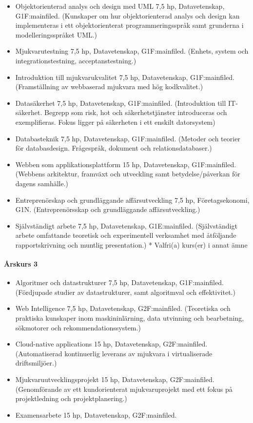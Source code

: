 \documentclass[swedish]{LnuCmThesis}
\begin{document}
\begin{itemize}
    \item Objektorienterad analys och design med UML 7,5 hp, Datavetenskap, G1F\fn:mainfiled{}. (Kunskaper om hur objektorienterad analys och design kan implementeras i ett objektorienterat programmeringsspråk samt grunderna i modelleringsspråket UML.)
    \item Mjukvarutestning 7,5 hp, Datavetenskap, G1F\fn:mainfiled{}. (Enhets­, system­ och integrationstestning, acceptanstestning.)
    \item Introduktion till mjukvarukvalitet 7,5 hp, Datavetenskap, G1F\fn:mainfiled{}. (Framställning av webbaserad mjukvara med hög kodkvalitet.)
    \item Datasäkerhet 7,5 hp, Datavetenskap, G1F\fn:mainfiled{}. (Introduktion till IT­säkerhet. Begrepp som risk, hot och säkerhetstjänster introduceras och exemplifieras. Fokus ligger på säkerheten i ett enskilt datorsystem)
    \item Databasteknik 7,5 hp, Datavetenskap, G1F\fn:mainfiled{}. (Metoder och teorier för databasdesign. Frågespråk, dokument­ och relationsdatabaser.)
    \item Webben som applikationsplattform 15 hp, Datavetenskap, G1F\fn:mainfiled{}. (Webbens arkitektur, framväxt och utveckling samt betydelse/påverkan för dagens samhälle.)
    \item Entreprenörskap och grundläggande affärsutveckling 7,5 hp, Företagsekonomi, G1N. (Entreprenörsskap och grundläggande affärsutveckling.)
    \item Självständigt arbete 7,5 hp, Datavetenskap, G1E\fn:mainfiled{}. (Självständigt arbete omfattande teoretisk och experimentell verksamhet med åtföljande rapportskrivning och muntlig presentation.)
    * Valfri(a) kurs(er) i annat ämne
\end{itemize}

\paragraph*{Årskurs 3}

\begin{itemize}
    \item Algoritmer och datastrukturer 7,5 hp, Datavetenskap, G1F\fn:mainfiled{}. (Fördjupade studier av datastrukturer, samt algoritmval och effektivitet.)
    \item Web Intelligence 7,5 hp, Datavetenskap, G2F\fn:mainfiled{}. (Teoretiska och praktiska kunskaper inom maskininlärning, data utvinning och bearbetning, sökmotorer och rekommendationssystem.)
    \item Cloud-native applications 15 hp, Datavetenskap, G2F\fn:mainfiled{}. (Automatiserad kontinuerlig leverans av mjukvara i virtualiserade driftsmiljöer.)
    \item Mjukvaruutvecklingsprojekt 15 hp, Datavetenskap, G2F\fn:mainfiled{}. (Genomförande av ett kundorienterat mjukvaruprojekt med ett fokus på projektledning och projektplanering.)
    \item Examensarbete 15 hp, Datavetenskap, G2F\fn:mainfiled{}.
\end{itemize}
\end{document}
